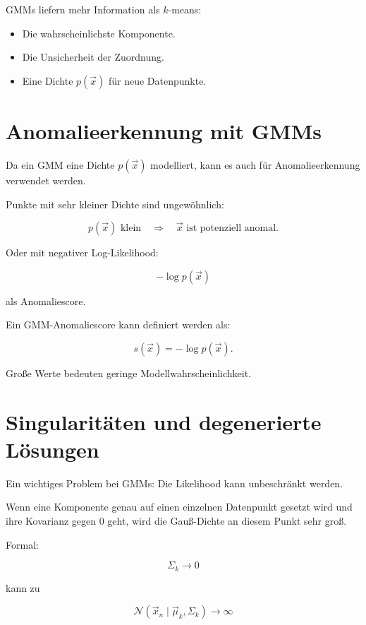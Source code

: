 \begin{conceptbox}
GMMs liefern mehr Information als \(k\)-means:

\begin{itemize}
    \item Die wahrscheinlichste Komponente.
    \item Die Unsicherheit der Zuordnung.
    \item Eine Dichte \(p(\vec{x})\) für neue Datenpunkte.
\end{itemize}
\end{conceptbox}

\section{Anomalieerkennung mit GMMs}

Da ein GMM eine Dichte \(p(\vec{x})\) modelliert, kann es auch für Anomalieerkennung verwendet werden.

Punkte mit sehr kleiner Dichte sind ungewöhnlich:

\[
    p(\vec{x}) \text{ klein}
    \quad
    \Rightarrow
    \quad
    \vec{x} \text{ ist potenziell anomal}.
\]

Oder mit negativer Log-Likelihood:

\[
    -\log p(\vec{x})
\]

als Anomaliescore.

\begin{definitionbox}
Ein GMM-Anomaliescore kann definiert werden als:

\[
    s(\vec{x})
    =
    -\log p(\vec{x}).
\]

Große Werte bedeuten geringe Modellwahrscheinlichkeit.
\end{definitionbox}

\section{Singularitäten und degenerierte Lösungen}

Ein wichtiges Problem bei GMMs:
Die Likelihood kann unbeschränkt werden.

Wenn eine Komponente genau auf einen einzelnen Datenpunkt gesetzt wird und ihre Kovarianz gegen \(0\) geht, wird die Gauß-Dichte an diesem Punkt sehr groß.

Formal:

\[
    \Sigma_k \to 0
\]

kann zu

\[
    \mathcal{N}(\vec{x}_n\mid\vec{\mu}_k,\Sigma_k)\to\infty
\]

